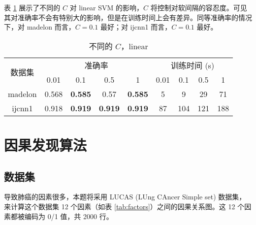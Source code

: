     表 \ref{tab:c} 展示了不同的 $C$ 对 linear SVM 的影响，$C$ 将控制对软间隔的容忍度。可见其对准确率不会有特别大的影响，但是在训练时间上会有差异。同等准确率的情况下，对 madelon 而言，$C=0.1$ 最好；对 ijcnn1 而言，$C=0.1$ 最好。

    \begin{table}[ht]
        \centering
        \caption{不同的 $C$，linear}\label{tab:c}
        \begin{tabular}{ccccccccc}
            \toprule
            \multirow{2}{*}{数据集} & \multicolumn{4}{c}{准确率} & \multicolumn{4}{c}{训练时间 (s)} \\
            \cmidrule(r){2-5}\cmidrule(l){6-9}
            & 0.01 & 0.1 & 0.5 & 1 & 0.01 & 0.1 & 0.5 & 1 \\
            \midrule
            madelon & 0.568 & \textbf{0.585} & 0.57 & \textbf{0.585} & 5 & 9  & 29 & 71 \\
            ijcnn1 & 0.918 & \textbf{0.919} & \textbf{0.919} & \textbf{0.919} & 87 & 104 & 121 & 188 \\
            \bottomrule
        \end{tabular}
    \end{table}

    \section{因果发现算法}

    \subsection{数据集}

    导致肺癌的因素很多，本题将采用 LUCAS (LUng CAncer Simple set) 数据集\cite{lucas}，来计算这个数据集 12 个因素（如表 \ref{tab:factors}）之间的因果关系图。这 12 个因素都被编码为 0/1 值，共 2000 行。

